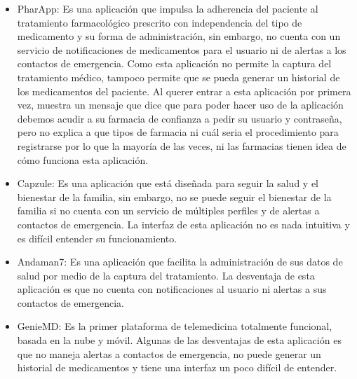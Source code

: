 \begin{itemize}
	\item PharApp: Es una aplicación que impulsa la adherencia del paciente al tratamiento farmacológico prescrito con independencia del tipo de medicamento y su forma de administración, sin embargo, no cuenta con un servicio de notificaciones de medicamentos para el usuario ni de alertas a los contactos de emergencia. Como esta aplicación no permite la captura del tratamiento médico, tampoco permite que se pueda generar un historial de los medicamentos del paciente. Al querer entrar a esta aplicación por primera vez, muestra un mensaje que dice que para poder hacer uso de la aplicación debemos acudir a su farmacia de confianza a pedir su usuario y contraseña, pero no explica a que tipos de farmacia ni cuál seria el procedimiento para registrarse por lo que la mayoría de las veces, ni las farmacias tienen idea de cómo funciona esta aplicación.
	
	\item Capzule: Es una aplicación que está diseñada para seguir la salud y el bienestar de la familia, sin embargo, no se puede seguir el bienestar de la familia si no cuenta con un servicio de múltiples perfiles y de alertas a contactos de emergencia. La interfaz de esta aplicación no es nada intuitiva y es difícil entender su funcionamiento.

	\item Andaman7: Es una aplicación que facilita la administración de sus datos de salud por medio de la captura del tratamiento. La desventaja de esta aplicación es que no cuenta con notificaciones al usuario ni alertas a sus contactos de emergencia. 
	
	\item GenieMD: Es la primer plataforma de telemedicina totalmente funcional, basada en la nube y móvil. Algunas de las desventajas de esta aplicación es que no maneja alertas a contactos de emergencia, no puede generar un historial de medicamentos y tiene una interfaz un poco difícil de entender.
	
\end{itemize}

	
